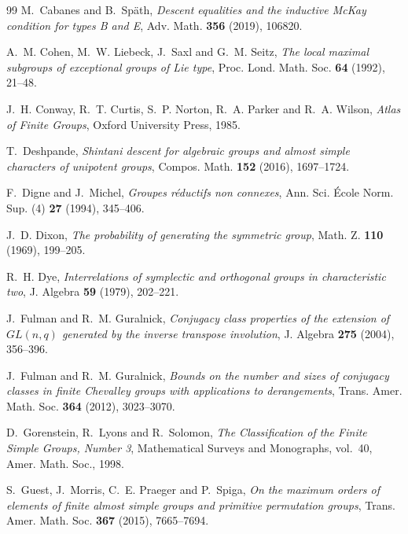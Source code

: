 \documentclass[11pt]{article}
\numberwithin{equation}{section}
\renewenvironment{thebibliography}[1]
{ \begin{oldthebibliography}{#1}
  \setlength{\parskip}{0pt}
  \setlength{\itemsep}{2pt plus 0.3ex}
  \bgroup\footnotesize }
{ \egroup \end{oldthebibliography} }
\theoremstyle{shdefinition}
\theoremstyle{shplain}
\newcommand{\<}{\langle}
\renewcommand{\>}{\rangle}
\renewcommand{\:}{\colon}
\begin{document}
\begin{thebibliography}{99}
M.~Cabanes and B.~Sp{\"{a}}th, \emph{Descent equalities and the inductive
  {M}c{K}ay condition for types {B} and {E}}, Adv. Math. \textbf{356} (2019),
  106820.

A.~M. Cohen, M.~W. Liebeck, J.~Saxl and G.~M. Seitz, \emph{The local maximal
  subgroups of exceptional groups of {L}ie type}, Proc. Lond. Math. Soc.
  \textbf{64} (1992), 21--48.

J.~H. Conway, R.~T. Curtis, S.~P. Norton, R.~A. Parker and R.~A. Wilson, 
  \emph{Atlas of Finite Groups}, Oxford University Press, 1985.

T.~Deshpande, \emph{Shintani descent for algebraic groups and almost simple
  characters of unipotent groups}, Compos. Math. \textbf{152} (2016),
  1697--1724.

F.~Digne and J.~Michel, \emph{Groupes r\'eductifs non connexes}, Ann. Sci.
  {\'E}cole Norm. Sup. (4) \textbf{27} (1994), 345--406.

J.~D. Dixon, \emph{The probability of generating the symmetric group}, Math. Z.
  \textbf{110} (1969), 199--205. 

R.~H. Dye, \emph{Interrelations of symplectic and orthogonal groups in
  characteristic two}, J. Algebra \textbf{59} (1979), 202--221.

J.~Fulman and R.~M. Guralnick, \emph{Conjugacy class properties of the
  extension of {$GL(n,q)$} generated by the inverse transpose involution}, J.
  Algebra \textbf{275} (2004), 356--396.
  
J.~Fulman and R.~M. Guralnick, \emph{Bounds on the number and sizes of 
  conjugacy classes in finite {C}hevalley groups with applications to 
  derangements}, Trans. Amer. Math. Soc. \textbf{364} (2012), 3023--3070.

D.~Gorenstein, R.~Lyons and R.~Solomon, \emph{The Classification of the Finite
  Simple Groups, Number 3}, Mathematical Surveys and Monographs, vol.~40, Amer.
  Math. Soc., 1998.

S.~Guest, J.~Morris, C.~E. Praeger and P.~Spiga, \emph{On the maximum orders of
  elements of finite almost simple groups and primitive permutation groups}, 
  Trans. Amer. Math. Soc. \textbf{367} (2015), 7665--7694.	


\end{thebibliography}
\end{document}
